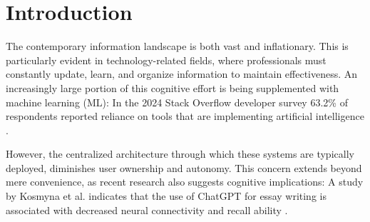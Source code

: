 \maketitle
\begin{abstract}
    Continual Learning can be computationally demanding, making on-device deployment challenging. In an effort to perform dimensionality reduction that can be dynamically adjusted based on user feedback and running on-device, this paper proposes a dataset generation pipeline, providing the foundation for such a model. With a subset of the Wikipedia dataset as a source, text embeddings are generated using pretrained models such as all-MiniLM-L6-v2, all-mpnet-base-v2 and nomic-embed-text-v1.5 \cite{nussbaumNomicEmbedTraining2025}. These high-dimensional vectors are then reduced to two-dimensional coordinates by applying UMAP and t-SNE. The resulting datasets are compared and analyzed regarding their visual legibility and spatial-semantic coherence. Alongside this paper, the generation pipeline and resulting datasets are published.
\end{abstract}

\section{Introduction}
\label{sec:intro}

The contemporary information landscape is both vast and inflationary. This is particularly evident in technology-related fields, where professionals must constantly update, learn, and organize information to maintain effectiveness. An increasingly large portion of this cognitive effort is being supplemented with machine learning (ML): In the 2024 Stack Overflow developer survey 63.2\% of respondents reported reliance on tools that are implementing artificial intelligence \cite{AI2024Stack}.

However, the centralized architecture through which these systems are typically deployed, diminishes user ownership and autonomy. This concern extends beyond mere convenience, as recent research also suggests cognitive implications: A study by Kosmyna et al. indicates that the use of ChatGPT for essay writing is associated with decreased neural connectivity and recall ability \cite{kosmynaYourBrainChatGPT2025}.

